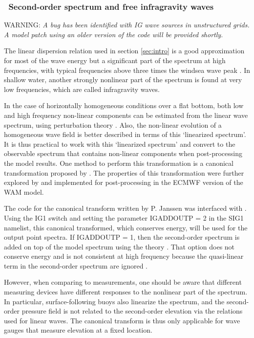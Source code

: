 \vsssub
\subsubsection{~Second-order spectrum and free infragravity waves} \label{sec:IG1}
\vsssub


\noindent 
WARNING: {\it A bug has been identified with IG wave sources in unstructured grids. 
A model patch using an older version of the code will be provided shortly.}

The linear dispersion relation used in section \ref{sec:intro} is a good
approximation for most of the wave energy but a significant part of the
spectrum at high frequencies, with typical frequencies above three times the
windsea wave peak \citep[e.g.][]{rep:Lec13}.  In shallow water, another
strongly nonlinear part of the spectrum is found at very low frequencies,
which are called infragravity waves.

In the case of horizontally homogeneous conditions over a flat bottom, both
low and high frequency non-linear components can be estimated from the linear
wave spectrum, using perturbation theory \citep[e.g.][]{art:Has62}. Also, the
non-linear evolution of a homogeneous wave field is better described in terms
of this `linearized spectrum'. It is thus practical to work with this
`linearized spectrum' and convert to the observable spectrum that contains
non-linear components when post-processing the model results. One method to
perform this transformation is a canonical transformation proposed by
\cite{art:Kra94}. The properties of this transformation were further explored
by \cite{art:Jan09} and implemented for post-processing in the ECMWF version
of the WAM model.

The code for the canonical transform written by P. Janssen was interfaced with
\ws.  Using the {\code IG1} switch and setting the parameter {\code IGADDOUTP
= 2} in the {\F SIG1} namelist, this canonical transformed, which conserves
energy, will be used for the output point spectra.  If {\code IGADDOUTP = 1},
then the second-order spectrum is added on top of the model spectrum using the
theory \citep[e.g.][]{art:Has62}. That option does not conserve energy and
is not consistent at high frequency because the quasi-linear term in the
second-order spectrum are ignored \citep{art:Jan09}.

However, when comparing to measurements, one should be aware that different
measuring devices have different responses to the nonlinear part of the
spectrum. In particular, surface-following buoys also linearize the spectrum,
and the second-order pressure field is not related to the second-order
elevation via the relations used for linear waves. The canonical transform is
thus only applicable for wave gauges that measure elevation at a fixed
location.

